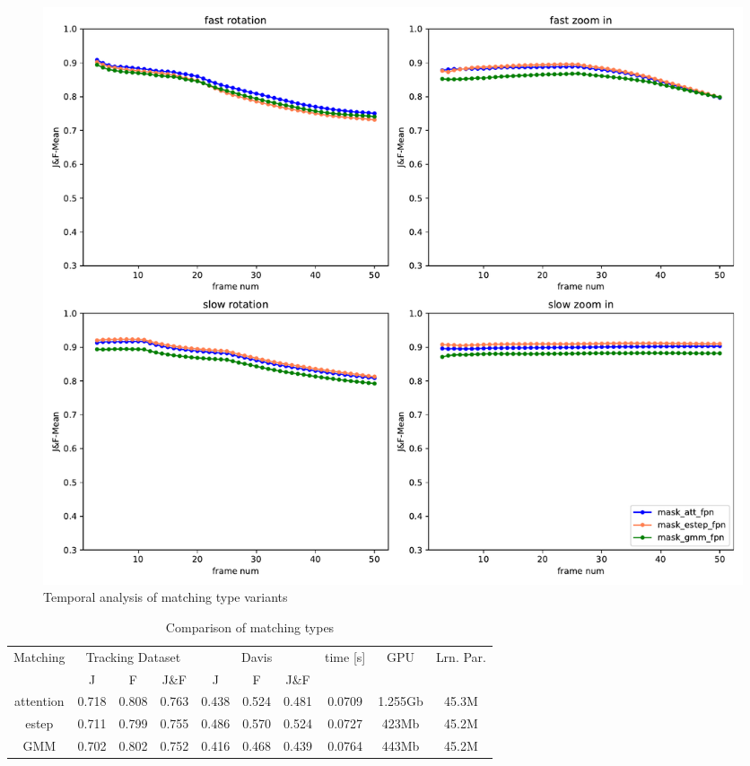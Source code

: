 \begin{figure}[ht!]
    \centering
    \includegraphics[width=1.\linewidth]{figures/04_experiments/matching_ablations/mask_att_fpn-mask_estep_fpn-mask_gmm_fpn-movement_all.pdf}
    \caption{Temporal analysis of matching type variants}
    \label{fig:matching_ablations_all}
    
\end{figure}
\begin{table}[h!]
\caption{Comparison of matching types}
\centering
\begin{tabular}{|c|ccc|ccc|c|c|c|}
\hline
\multicolumn{1}{|c|}{\multirow{2}{*}{Matching}} & 
 \multicolumn{3}{c|}{Tracking Dataset}                     & \multicolumn{3}{c|}{Davis} & \multicolumn{1}{c|}{\multirow{2}{*}{time [s]}} & \multicolumn{1}{c|}{\multirow{2}{*}{GPU}} &
 \multicolumn{1}{c|}{\multirow{2}{*}{Lrn. Par.}} \\ \cline{2-7} 
 \multicolumn{1}{|c|}{} &
 \multicolumn{1}{c|}{J} & \multicolumn{1}{c|}{F} & \multicolumn{1}{c|}{J\&F} & \multicolumn{1}{c|}{J} & \multicolumn{1}{c|}{F} & \multicolumn{1}{c|}{J\&F} &\multicolumn{1}{c|}{} &\multicolumn{1}{c|}{} 
 &\multicolumn{1}{c|}{} \\ \hline

attention  & 0.718 & 0.808 & 0.763 &  0.438 & 0.524 & 0.481 &   0.0709  &  1.255Gb & 45.3M  \\ 

estep  & 0.711 & 0.799 & 0.755 & 0.486 & 0.570 & 0.524 & 0.0727  & 423Mb & 45.2M  \\                   

GMM   & 0.702  & 0.802  &  0.752 & 0.416 & 0.468 & 0.439 & 0.0764 & 443Mb &  45.2M  \\ \hline

\end{tabular}
 \label{Tab:matching_ablations}
\end{table}

